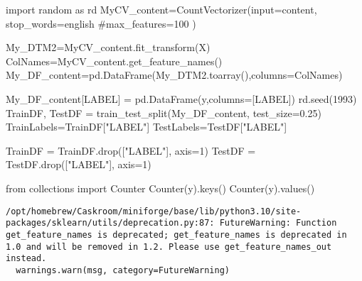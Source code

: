 \documentclass[
  letterpaper,
  DIV=11,
  numbers=noendperiod]{scrartcl}
\newenvironment{Shaded}{\begin{snugshade}}{\end{snugshade}}
\newcommand{\BuiltInTok}[1]{\textcolor[rgb]{0.00,0.23,0.31}{#1}}
\newcommand{\CommentTok}[1]{\textcolor[rgb]{0.37,0.37,0.37}{#1}}
\newcommand{\DecValTok}[1]{\textcolor[rgb]{0.68,0.00,0.00}{#1}}
\newcommand{\FloatTok}[1]{\textcolor[rgb]{0.68,0.00,0.00}{#1}}
\newcommand{\ImportTok}[1]{\textcolor[rgb]{0.00,0.46,0.62}{#1}}
\newcommand{\NormalTok}[1]{\textcolor[rgb]{0.00,0.23,0.31}{#1}}
\newcommand{\OperatorTok}[1]{\textcolor[rgb]{0.37,0.37,0.37}{#1}}
\newcommand{\StringTok}[1]{\textcolor[rgb]{0.13,0.47,0.30}{#1}}
\begin{document}
\begin{Shaded}
\begin{Highlighting}[]
\ImportTok{import}\NormalTok{ random }\ImportTok{as}\NormalTok{ rd}
\NormalTok{MyCV\_content}\OperatorTok{=}\NormalTok{CountVectorizer(}\BuiltInTok{input}\OperatorTok{=}\StringTok{\textquotesingle{}content\textquotesingle{}}\NormalTok{,}
\NormalTok{                        stop\_words}\OperatorTok{=}\StringTok{\textquotesingle{}english\textquotesingle{}}
                        \CommentTok{\#max\_features=100}
\NormalTok{                        )}

\NormalTok{My\_DTM2}\OperatorTok{=}\NormalTok{MyCV\_content.fit\_transform(X)}
\NormalTok{ColNames}\OperatorTok{=}\NormalTok{MyCV\_content.get\_feature\_names()}
\NormalTok{My\_DF\_content}\OperatorTok{=}\NormalTok{pd.DataFrame(My\_DTM2.toarray(),columns}\OperatorTok{=}\NormalTok{ColNames)}


\NormalTok{My\_DF\_content[}\StringTok{\textquotesingle{}LABEL\textquotesingle{}}\NormalTok{] }\OperatorTok{=}\NormalTok{ pd.DataFrame(y,columns}\OperatorTok{=}\NormalTok{[}\StringTok{\textquotesingle{}LABEL\textquotesingle{}}\NormalTok{])}
\NormalTok{rd.seed(}\DecValTok{1993}\NormalTok{)}
\NormalTok{TrainDF, TestDF }\OperatorTok{=}\NormalTok{ train\_test\_split(My\_DF\_content, test\_size}\OperatorTok{=}\FloatTok{0.25}\NormalTok{)}
\NormalTok{TrainLabels}\OperatorTok{=}\NormalTok{TrainDF[}\StringTok{"LABEL"}\NormalTok{]}
\NormalTok{TestLabels}\OperatorTok{=}\NormalTok{TestDF[}\StringTok{"LABEL"}\NormalTok{]}

\NormalTok{TrainDF }\OperatorTok{=}\NormalTok{ TrainDF.drop([}\StringTok{"LABEL"}\NormalTok{], axis}\OperatorTok{=}\DecValTok{1}\NormalTok{)}
\NormalTok{TestDF }\OperatorTok{=}\NormalTok{ TestDF.drop([}\StringTok{"LABEL"}\NormalTok{], axis}\OperatorTok{=}\DecValTok{1}\NormalTok{)}

\ImportTok{from}\NormalTok{ collections }\ImportTok{import}\NormalTok{ Counter}
\NormalTok{Counter(y).keys()}
\NormalTok{Counter(y).values()}
\end{Highlighting}
\end{Shaded}

\begin{verbatim}
/opt/homebrew/Caskroom/miniforge/base/lib/python3.10/site-packages/sklearn/utils/deprecation.py:87: FutureWarning: Function get_feature_names is deprecated; get_feature_names is deprecated in 1.0 and will be removed in 1.2. Please use get_feature_names_out instead.
  warnings.warn(msg, category=FutureWarning)
\end{verbatim}
\end{document}
